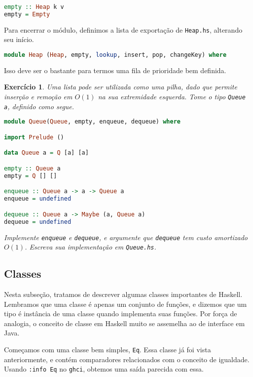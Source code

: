 \documentclass[a4paper]{article}
\newtheorem{exercicio}{Exercício}
\begin{document}
\begin{lstlisting}[language=haskell, frame=single]
empty :: Heap k v
empty = Empty
\end{lstlisting}

Para encerrar o módulo, definimos a lista de exportação de \texttt{Heap.hs}, alterando seu início.

\begin{lstlisting}[language=haskell, frame=single]
module Heap (Heap, empty, lookup, insert, pop, changeKey) where
\end{lstlisting}

Isso deve ser o bastante para termos uma fila de prioridade bem definida. 

\begin{exercicio}
	Uma lista pode ser utilizada como uma pilha, dado que permite inserção e remoção em $O(1)$ na sua extremidade esquerda.
	Tome o tipo \emph{\texttt{Queue a}}, definido como segue.
	\begin{lstlisting}[language=haskell, frame=single]
module Queue(Queue, empty, enqueue, dequeue) where

import Prelude ()

data Queue a = Q [a] [a]

empty :: Queue a
empty = Q [] []

enqueue :: Queue a -> a -> Queue a
enqueue = undefined

dequeue :: Queue a -> Maybe (a, Queue a)
dequeue = undefined
	\end{lstlisting}
	Implemente \emph{\texttt{enqueue}} e \emph{\texttt{dequeue}}, e argumente que \emph{\texttt{dequeue}} tem custo amortizado $O(1)$.
	Escreva sua implementação em \emph{\texttt{Queue.hs}}.
\end{exercicio}

\subsection{Classes}

Nesta subseção, tratamos de descrever algumas classes importantes de Haskell.
Lembramos que uma classe é apenas um conjunto de funções, e dizemos que um tipo é instância de uma classe quando implementa suas funções.
Por força de analogia, o conceito de classe em Haskell muito se assemelha ao de interface em Java.

Começamos com uma classe bem simples, \texttt{Eq}.
Essa classe já foi vista anteriormente, e contém comparadores relacionados com o conceito de igualdade.
Usando \texttt{:info Eq} no \texttt{ghci}, obtemos uma saída parecida com essa.
\end{document}
